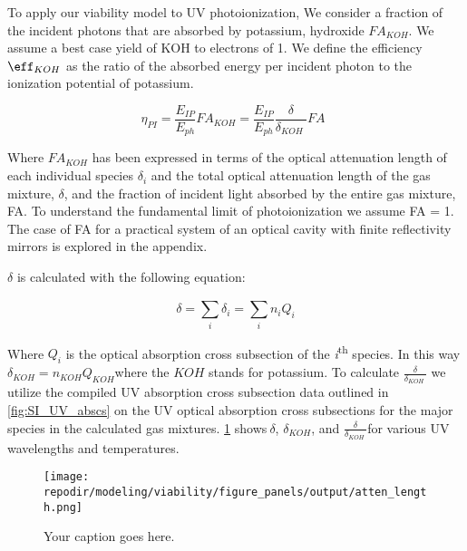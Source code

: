 To apply our viability model to UV photoionization, We consider a fraction of the incident photons that are absorbed by potassium, hydroxide \(FA_{KOH}\). We assume a best case yield of KOH to electrons of 1. We define the efficiency $\eff_{KOH}$ as the ratio of the absorbed energy per incident photon to the ionization potential of potassium.


\begin{equation}
\eta_{PI} = \frac{E_{IP}}{E_{ph}}FA_{KOH} = \frac{E_{IP}}{E_{ph}}\frac{\delta}{\delta_{KOH}\ }FA\ \ 
\end{equation}

Where \(FA_{KOH}\) has been expressed in terms of the optical attenuation length of each individual species \(\delta_{i}\) and the total optical attenuation length of the gas mixture, \(\delta\), and the fraction of incident light absorbed by the entire gas mixture, FA. To understand the fundamental limit of photoionization we assume FA = 1. The case of FA for a practical system of an optical cavity with finite reflectivity mirrors is explored in the appendix.

\(\delta\) is calculated with the following equation:

\begin{equation}
\delta = \sum_{i}^{}\delta_{i} = \sum_{i}^{}{n_{i}Q_{i}}
\end{equation}

Where \(Q_{i}\) is the optical absorption cross subsection of the \emph{i}\textsuperscript{th} species. In this way \(\delta_{KOH} = n_{KOH}Q_{KOH}\)where the \(KOH\) stands for potassium. To calculate \(\frac{\delta}{\delta_{KOH}\ }\) we utilize the compiled UV absorption cross subsection data outlined in \ref{fig:SI_UV_abscs} on the UV optical absorption cross subsections for the major species in the calculated gas mixtures. \ref{fig:SI_atten_length} shows\(\ \delta\), \(\delta_{KOH}\), and \(\frac{\delta}{\delta_{KOH}\ }\)for various UV wavelengths and temperatures.


\begin{figure}[ht]
    \centering
    \texttt{[image: \\repodir/modeling/viability/figure\_panels/output/atten\_length.png]}
    \caption{Your caption goes here.}
    \label{fig:SI_atten_length}
\end{figure}


